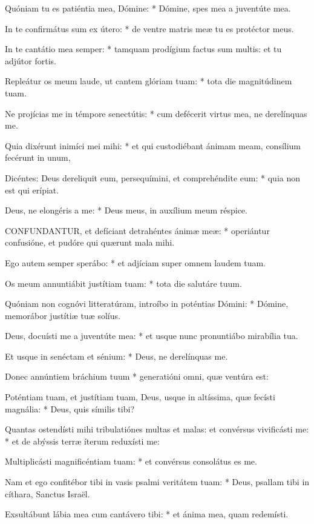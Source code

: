 Quóniam tu es patiéntia mea, Dómine: * Dómine, spes mea a juventúte mea.

In te confirmátus sum ex útero: * de ventre matris meæ tu es protéctor meus.

In te cantátio mea semper: * tamquam prodígium factus sum multis: et tu adjútor fortis.

Repleátur os meum laude, ut cantem glóriam tuam: * tota die magnitúdinem tuam.

Ne projícias me in témpore senectútis: * cum defécerit virtus mea, ne derelínquas me.

Quia dixérunt inimíci mei mihi: * et qui custodiébant ánimam meam, consílium fecérunt in unum,

Dicéntes: Deus dereliquit eum, persequímini, et comprehéndite eum: * quia non est qui erípiat.

Deus, ne elongéris a me: * Deus meus, in auxílium meum réspice.


\lettrine[lines=2]{C}{ONFUNDANTUR}, et defíciant detrahéntes ánimæ meæ: * operiántur confusióne, et pudóre qui quærunt mala mihi.

Ego autem semper sperábo: * et adjíciam super omnem laudem tuam.

Os meum annuntiábit justítiam tuam: * tota die salutáre tuum.

Quóniam non cognóvi litteratúram, introíbo in poténtias Dómini: * Dómine, memorábor justítiæ tuæ solíus.

Deus, docuísti me a juventúte mea: * et usque nunc pronuntiábo mirabília tua.

Et usque in senéctam et sénium: * Deus, ne derelínquas me.

Donec annúntiem bráchium tuum * generatióni omni, quæ ventúra est:

Poténtiam tuam, et justítiam tuam, Deus, usque in altíssima, quæ fecísti magnália: * Deus, quis símilis tibi?

Quantas ostendísti mihi tribulatiónes multas et malas: et convérsus vivificásti me: * et de abýssis terræ íterum reduxísti me:

Multiplicásti magnificéntiam tuam: * et convérsus consolátus es me.

Nam et ego confitébor tibi in vasis psalmi veritátem tuam: * Deus, psallam tibi in cíthara, Sanctus Israël.

Exsultábunt lábia mea cum cantávero tibi: * et ánima mea, quam redemísti.

